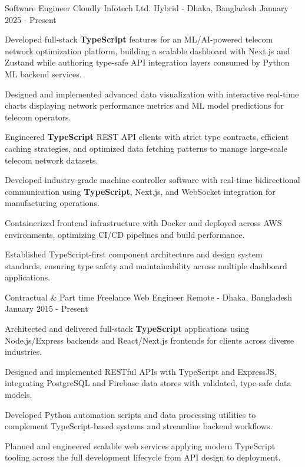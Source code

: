 
\begin{cventries}

    \cventry
        {Software Engineer}
        {Cloudly Infotech Ltd.}
        {Hybrid - Dhaka, Bangladesh}
        {January 2025 - Present}
        {
            \begin{cvitems}
                \item {Developed full-stack \textbf{TypeScript} features for an ML/AI-powered telecom network optimization platform, building a scalable dashboard with Next.js and Zustand while authoring type-safe API integration layers consumed by Python ML backend services.}
                \item {Designed and implemented advanced data visualization with interactive real-time charts displaying network performance metrics and ML model predictions for telecom operators.}
                \item {Engineered \textbf{TypeScript} REST API clients with strict type contracts, efficient caching strategies, and optimized data fetching patterns to manage large-scale telecom network datasets.}
                \item {Developed industry-grade machine controller software with real-time bidirectional communication using \textbf{TypeScript}, Next.js, and WebSocket integration for manufacturing operations.}
                \item {Containerized frontend infrastructure with Docker and deployed across AWS environments, optimizing CI/CD pipelines and build performance.}
                \item {Established TypeScript-first component architecture and design system standards, ensuring type safety and maintainability across multiple dashboard applications.}
            \end{cvitems}
        }

    \cventry
        {Contractual \& Part time}
        {Freelance Web Engineer}
        {Remote - Dhaka, Bangladesh}
        {January 2015 - Present}
        {
            \begin{cvitems}
                \item {Architected and delivered full-stack \textbf{TypeScript} applications using Node.js/Express backends and React/Next.js frontends for clients across diverse industries.}
                \item {Designed and implemented RESTful APIs with TypeScript and ExpressJS, integrating PostgreSQL and Firebase data stores with validated, type-safe data models.}
                \item {Developed Python automation scripts and data processing utilities to complement TypeScript-based systems and streamline backend workflows.}
                \item {Planned and engineered scalable web services applying modern TypeScript tooling across the full development lifecycle from API design to deployment.}
            \end{cvitems}
        }


\end{cventries}

